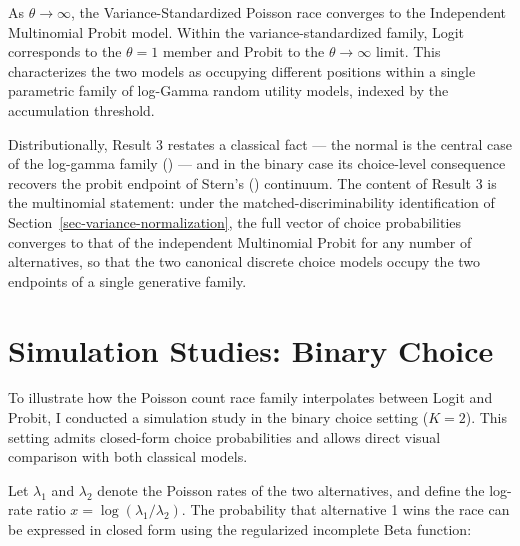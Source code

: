 \documentclass[
  man,
  floatsintext,
  longtable,
  a4paper,
  nolmodern,
  notxfonts,
  notimes,
  colorlinks=true,linkcolor=blue,citecolor=blue,urlcolor=blue]{apa7}
\begin{document}
\begin{tcolorbox}[enhanced jigsaw, arc=.35mm, bottomrule=.15mm, bottomtitle=1mm, breakable, colback=white, colbacktitle=quarto-callout-note-color!10!white, colframe=quarto-callout-note-color-frame, coltitle=black, left=2mm, leftrule=.75mm, opacityback=0, opacitybacktitle=0.6, rightrule=.15mm, title={Result 3 (Probit Limit)}, titlerule=0mm, toprule=.15mm, toptitle=1mm]

As \(\theta \to \infty\), the Variance-Standardized Poisson race
converges to the Independent Multinomial Probit model. Within the
variance-standardized family, Logit corresponds to the \(\theta=1\)
member and Probit to the \(\theta \to \infty\) limit. This characterizes
the two models as occupying different positions within a single
parametric family of log-Gamma random utility models, indexed by the
accumulation threshold.

\end{tcolorbox}

Distributionally, Result 3 restates a classical fact --- the normal is
the central case of the log-gamma family
() --- and in
the binary case its choice-level consequence recovers the probit
endpoint of Stern's
() continuum.
The content of Result 3 is the multinomial statement: under the
matched-discriminability identification of
Section~\ref{sec-variance-normalization}, the full vector of choice
probabilities converges to that of the independent Multinomial Probit
for any number of alternatives, so that the two canonical discrete
choice models occupy the two endpoints of a single generative family.

\section{Simulation Studies: Binary
Choice}\label{sec-binary-simulations}

To illustrate how the Poisson count race family interpolates between
Logit and Probit, I conducted a simulation study in the binary choice
setting (\(K=2\)). This setting admits closed-form choice probabilities
and allows direct visual comparison with both classical models.

Let \(\lambda_1\) and \(\lambda_2\) denote the Poisson rates of the two
alternatives, and define the log-rate ratio
\(x = \log(\lambda_1/\lambda_2)\). The probability that alternative 1
wins the race can be expressed in closed form using the regularized
incomplete Beta function:
\end{document}
